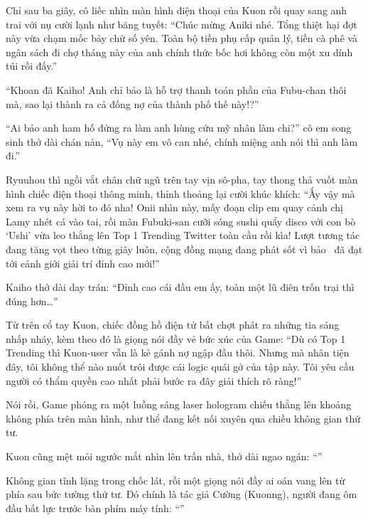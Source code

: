 \documentclass[../main.tex]{subfiles}
\begin{document}
Chỉ sau ba giây, cô liếc nhìn màn hình điện thoại của Kuon rồi quay sang anh trai với nụ cười lạnh như băng tuyết: ``Chúc mừng Aniki nhé. Tổng thiệt hại đợt này vừa chạm mốc bảy chữ số yên. Toàn bộ tiền phụ cấp quản lý, tiền cà phê và ngân sách đi chợ tháng này của anh chính thức bốc hơi không còn một xu dính túi rồi đấy.''

``Khoan đã Kaiho! Anh chỉ bảo là hỗ trợ thanh toán phần của Fubu-chan thôi mà, sao lại thành ra cả đống nợ của thành phố thế này!?''

``Ai bảo anh ham hố đứng ra làm anh hùng cứu mỹ nhân làm chi?'' cô em song sinh thở dài chán nản, ``Vụ này em vô can nhé, chính miệng anh nói thì anh làm đi.''

Ryuuhou thì ngồi vắt chân chữ ngũ trên tay vịn sô-pha, tay thong thả vuốt màn hình chiếc điện thoại thông minh, thỉnh thoảng lại cười khúc khích: ``Ấy vậy mà xem ra vụ này hời to đó nha! Onii nhìn này, mấy đoạn clip em quay cảnh chị Lamy nhét cá vào tai, rồi màn Fubuki-san cưỡi sóng sushi quẩy disco với con bò `Ushi' vừa leo thẳng lên Top 1 Trending Twitter toàn cầu rồi kìa! Lượt tương tác đang tăng vọt theo từng giây luôn, cộng đồng mạng đang phát sốt vì bảo \hll\ đã đạt tới cảnh giới giải trí đỉnh cao mới!''

Kaiho thở dài day trán: ``Đỉnh cao cái đầu em ấy, toàn một lũ điên trốn trại thì đúng hơn\dots''

Từ trên cổ tay Kuon, chiếc đồng hồ điện tử bất chợt phát ra những tia sáng nhấp nháy, kèm theo đó là giọng nói đầy vẻ bức xúc của Game: ``Dù có Top 1 Trending thì Kuon-user vẫn là kẻ gánh nợ ngập đầu thôi. Nhưng mà nhân tiện đây, tôi không thể nào nuốt trôi được cái logic quái gở của tập này. Tôi yêu cầu người có thẩm quyền cao nhất phải bước ra đây giải thích rõ ràng!''

\il

Nói rồi, Game phóng ra một luồng sáng laser hologram chiếu thẳng lên khoảng không phía trên màn hình, như thể đang kết nối xuyên qua chiều không gian thứ tư.

Kuon cũng mệt mỏi ngước mắt nhìn lên trần nhà, thở dài ngao ngán: ``''

Không gian tĩnh lặng trong chốc lát, rồi một giọng nói đầy ai oán vang lên từ phía sau bức tường thứ tư. Đó chính là tác giả Cường (Kuonng), người đang ôm đầu bất lực trước bàn phím máy tính: ``''
\end{document}

